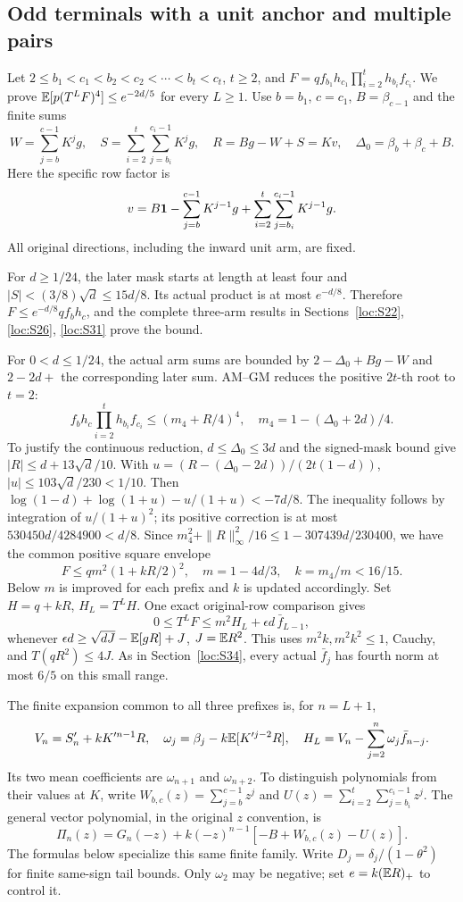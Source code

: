 \subsection{Odd terminals with a unit anchor and multiple pairs}\label{loc:S35}
Let $2\le b_1<c_1<b_2<c_2<\cdots<b_t<c_t$, $t\ge2$, and
$F=qf_{b_1}h_{c_1}\prod_{i=2}^th_{b_i}f_{c_i}$.
We prove $\mathbb E[p(T^LF)^4]\le e^{-2d/5}$ for every $L\ge1$.
Use $b=b_1$, $c=c_1$, $B=\beta_{c-1}$ and the finite sums
\[
 W=\sum_{j=b}^{c-1}K^jg,\quad
 S=\sum_{i=2}^t\sum_{j=b_i}^{c_i-1}K^jg,\quad
 R=Bg-W+S=Kv,\quad\Delta_0=\beta_b+\beta_c+B.
\]
Here the specific row factor is
\[
 v=B\mathbf1-\sum_{j=b}^{c-1}K^{j-1}g
       +\sum_{i=2}^t\sum_{j=b_i}^{c_i-1}K^{j-1}g.
\]
All original directions, including the inward unit arm, are fixed.

For $d\ge1/24$, the later mask starts at length at least four and
$|S|<(3/8)\sqrt d\le15d/8$.
Its actual product is at most $e^{-d/8}$.
Therefore $F\le e^{-d/8}qf_bh_c$, and the complete three-arm results
in Sections~\ref{loc:S22}, \ref{loc:S26}, \ref{loc:S31} prove the bound.

For $0<d\le1/24$, the actual arm sums are bounded by
$2-\Delta_0+Bg-W$ and $2-2d+$ the corresponding later sum.
AM--GM reduces the positive $2t$-th root to $t=2$:
\[
 f_bh_c\prod_{i=2}^th_{b_i}f_{c_i}\le(m_4+R/4)^4,\quad
 m_4=1-(\Delta_0+2d)/4.
\]
To justify the continuous reduction, $d\le\Delta_0\le3d$ and the
signed-mask bound give $|R|\le d+13\sqrt d/10$.
With $u=(R-(\Delta_0-2d))/(2t(1-d))$,
$|u|\le103\sqrt d/230<1/10$.
Then $\log(1-d)+\log(1+u)-u/(1+u)<-7d/8$.
The inequality follows by integration of $u/(1+u)^2$;
its positive correction is at most $530450d/4284900<d/8$.
Since $m_4^2+\|R\|_\infty^2/16\le1-307439d/230400$,
we have the common positive square envelope
\[
 F\le qm^2(1+kR/2)^2,\quad m=1-4d/3,\quad
 k=m_4/m<16/15.
\]
Below $m$ is improved for each prefix and $k$ is updated accordingly.
Set $H=q+kR$, $H_L=T^LH$.
One exact original-row comparison gives
\begin{equation}\label{eq:compact-unit-row}
 0\le T^LF\le m^2H_L+\epsilon d\,\bar f_{L-1},
\end{equation}
whenever
$\epsilon d\ge\sqrt{dJ}-\mathbb E[gR]+J$, $J=\mathbb E R^2$.
This uses $m^2k,m^2k^2\le1$, Cauchy, and $T(qR^2)\le4J$.
As in Section~\ref{loc:S34}, every actual $\bar f_{j}$ has fourth norm at
most $6/5$ on this small range.

The finite expansion common to all three prefixes is, for $n=L+1$,
\begin{equation}\label{eq:compact-unit-deltas}
 V_n=S'_n+kK'^{n-1}R,\quad
 \omega_j=\beta_j-k\mathbb E[K'^{j-2}R],\quad
 H_L=V_n-\sum_{j=2}^n\omega_j\bar f_{n-j}.
\end{equation}
Its two mean coefficients are $\omega_{n+1}$ and $\omega_{n+2}$.
To distinguish polynomials from their values at $K$, write
$W_{b,c}(z)=\sum_{j=b}^{c-1}z^j$ and
$U(z)=\sum_{i=2}^t\sum_{j=b_i}^{c_i-1}z^j$.
The general vector polynomial, in the original $z$ convention, is
\[
 \Pi_n(z)=G_n(-z)+k(-z)^{n-1}[-B+W_{b,c}(z)-U(z)].
\]
The formulas below specialize this same finite family.
Write $D_j=\delta_{j}/(1-\theta^2)$ for finite same-sign tail bounds.
Only $\omega_2$ may be negative; set $e=k(\mathbb E R)_+$ to control it.


